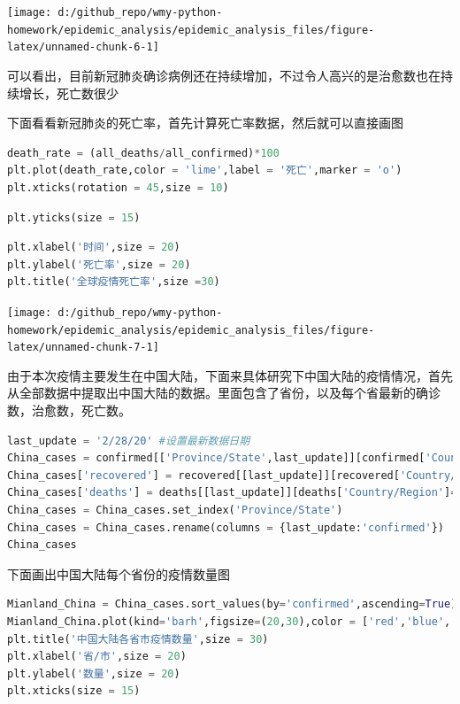 \documentclass[UTF8,a4paper,12pt]{ctexart}  %
\begin{document}
\begin{center}\texttt{[image: d:/github\_repo/wmy-python-homework/epidemic\_analysis/epidemic\_analysis\_files/figure-latex/unnamed-chunk-6-1]} \end{center}

可以看出，目前新冠肺炎确诊病例还在持续增加，不过令人高兴的是治愈数也在持续增长，死亡数很少

下面看看新冠肺炎的死亡率，首先计算死亡率数据，然后就可以直接画图

\begin{lstlisting}[language=Python]
death_rate = (all_deaths/all_confirmed)*100
plt.plot(death_rate,color = 'lime',label = '死亡',marker = 'o')
plt.xticks(rotation = 45,size = 10)
\end{lstlisting}

\begin{lstlisting}[language=Python]
plt.yticks(size = 15)
\end{lstlisting}

\begin{lstlisting}[language=Python]
plt.xlabel('时间',size = 20)
plt.ylabel('死亡率',size = 20)
plt.title('全球疫情死亡率',size =30)
\end{lstlisting}

\begin{center}\texttt{[image: d:/github\_repo/wmy-python-homework/epidemic\_analysis/epidemic\_analysis\_files/figure-latex/unnamed-chunk-7-1]} \end{center}

由于本次疫情主要发生在中国大陆，下面来具体研究下中国大陆的疫情情况，首先从全部数据中提取出中国大陆的数据。里面包含了省份，以及每个省最新的确诊数，治愈数，死亡数。

\begin{lstlisting}[language=Python]
last_update = '2/28/20' #设置最新数据日期
China_cases = confirmed[['Province/State',last_update]][confirmed['Country/Region']=='Mainland China']
China_cases['recovered'] = recovered[[last_update]][recovered['Country/Region']=='Mainland China']
China_cases['deaths'] = deaths[[last_update]][deaths['Country/Region']=='Mainland China']
China_cases = China_cases.set_index('Province/State')
China_cases = China_cases.rename(columns = {last_update:'confirmed'})
China_cases
\end{lstlisting}

下面画出中国大陆每个省份的疫情数量图

\begin{lstlisting}[language=Python]
Mianland_China = China_cases.sort_values(by='confirmed',ascending=True)
Mianland_China.plot(kind='barh',figsize=(20,30),color = ['red','blue','lime'],width = 1,rot = 2)
plt.title('中国大陆各省市疫情数量',size = 30)
plt.xlabel('省/市',size = 20)
plt.ylabel('数量',size = 20)
plt.xticks(size = 15)
\end{lstlisting}
\end{document}
